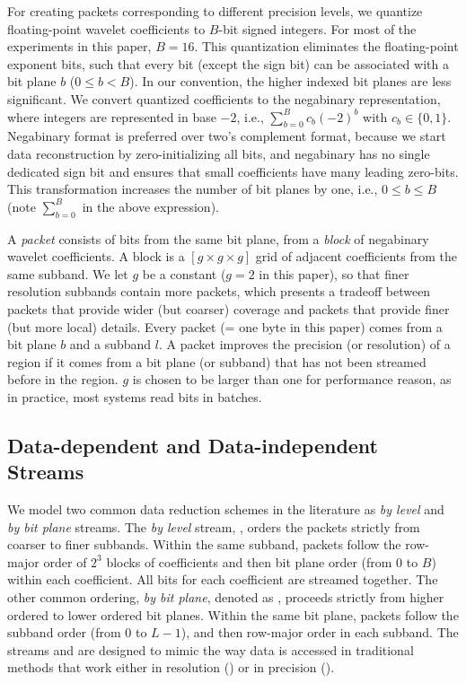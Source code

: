 For creating packets corresponding to different precision levels, we quantize floating-point wavelet
coefficients to $B$-bit signed integers. For most of the experiments in this paper, $B=16$. This
quantization eliminates the floating-point exponent bits, such that every bit (except the sign bit)
can be associated with a bit plane $b$ ($0\leq b < B$). In our convention, the higher indexed bit 
planes are less significant. We convert quantized coefficients to the negabinary representation, where integers are represented in base $-2$, i.e., $\sum_{b=0}^{B}{c_b(-2)^b}$ with $c_b\in \{0,1\}$. 
Negabinary format is preferred over two's complement format, because we start data reconstruction by 
zero-initializing all bits, and negabinary has no single dedicated sign bit and ensures that small coefficients have many leading zero-bits.
%
This transformation increases the number of bit planes by one, i.e., $0\leq b \leq B$ 
(note $\sum_{b=0}^{B}$ in the above expression).

A \emph{packet} consists of bits from the same bit plane, from a \emph{block} of negabinary
wavelet coefficients. A block is a $[g\times g\times g]$ grid of adjacent coefficients from the same
subband. We let $g$ be a constant ($g=2$ in this paper), so that finer resolution subbands contain
more packets, which presents a tradeoff between packets that provide wider (but coarser) coverage
and packets that provide finer (but more local) details. Every packet (= one byte in this paper) 
comes from a bit plane $b$
and a subband $l$. A packet improves the precision (or resolution) of a region if it comes from a
bit plane (or subband) that has not been streamed before in the region. $g$ is chosen to be larger
than one for performance reason, as in practice, most systems read bits in batches.

\subsection{Data-dependent and Data-independent Streams} \label{sec:static-dynamic-streams}

We model two common data reduction schemes in the literature as \emph{by level} and \emph{by bit
plane} streams. The \emph{by level} stream, \slvl, orders the packets strictly from coarser to finer
subbands. Within the same subband, packets follow the row-major order of $2^3$ blocks of
coefficients and then bit plane order (from 0 to $B$) within each coefficient. All bits for each
coefficient are streamed together. The other common ordering, \emph{by bit plane}, denoted as \sbit,
proceeds strictly from higher ordered to lower ordered bit planes. Within the same bit plane,
packets follow the subband order (from $0$ to $L-1$), and then row-major order in each subband. The
streams \slvl and \sbit are designed to mimic the way data is accessed in traditional methods that
work either in resolution (\slvl) or in precision (\sbit).


